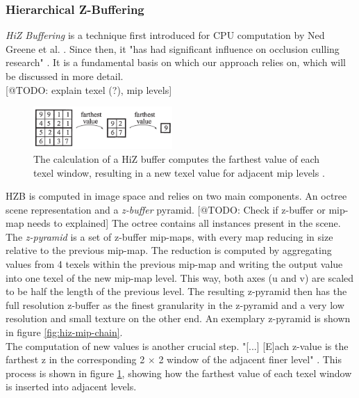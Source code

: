 \subsubsection*{Hierarchical Z-Buffering} \label{subsubsec-hierarchical-z-buffering}

\emph{\ac{HiZ} Buffering} is a technique first introduced for \ac{CPU} computation by Ned Greene et al. 
\cite{Greene93,Greene95}. Since then, it "has had significant influence on occlusion culling research" 
\cite{AkenineMoeller2018}. It is a fundamental basis on which our approach relies on, which will be discussed 
in more detail.\\


[@TODO: explain texel (?), mip levels]
\begin{figure}[h]
    \centering
    \includegraphics[width=200px]{images/graphics/hiz-buf-values.jpg}
    \caption{The calculation of a \ac{HiZ} buffer computes the farthest value of each texel window, 
    resulting in a new texel value for adjacent mip levels \cite{AkenineMoeller2018}.}
    \label{fig:hiz-value-computation}
\end{figure}

\noindent
\ac{HZB} is computed in image space and relies on two main components. An octree scene representation and a 
\emph{z-buffer} pyramid. [@TODO: Check if z-buffer or mip-map needs to explained] 
The octree contains all instances present in the scene. The \emph{z-pyramid} is a set of z-buffer mip-maps, with every 
map reducing in size relative to the previous mip-map. The reduction is computed by aggregating values from 4 texels 
within the previous mip-map and writing the output value into one texel of the new mip-map level. This way, both axes 
(u and v) are scaled to be half the length of the previous level. The resulting z-pyramid then has the full resolution 
z-buffer as the finest granularity in the z-pyramid and a very low resolution and small texture on the other end. 
An exemplary z-pyramid is shown in figure \ref{fig:hiz-mip-chain}.\\

\noindent
The computation of new values is another crucial step. "[...] [E]ach z-value is the farthest z in the corresponding 
2 \begin{math}\times\end{math} 2 window of the adjacent finer level" \cite{AkenineMoeller2018}. This process is shown 
in figure \ref{fig:hiz-value-computation}, showing how the farthest value of each texel window is inserted into adjacent 
levels.\\

